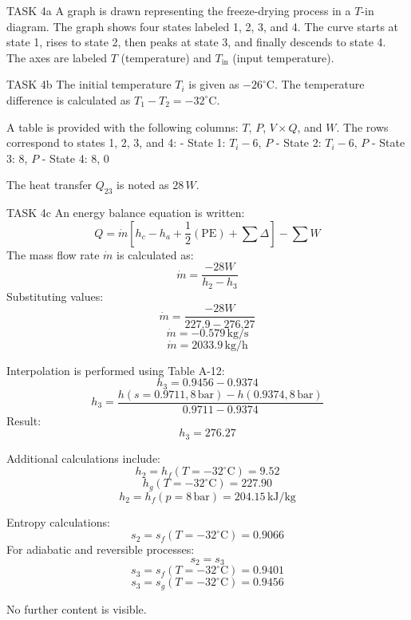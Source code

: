 TASK 4a  
A graph is drawn representing the freeze-drying process in a \( T \)-\( \text{in} \) diagram. The graph shows four states labeled 1, 2, 3, and 4. The curve starts at state 1, rises to state 2, then peaks at state 3, and finally descends to state 4. The axes are labeled \( T \) (temperature) and \( T_{\text{in}} \) (input temperature).  

TASK 4b  
The initial temperature \( T_i \) is given as \( -26^\circ\text{C} \). The temperature difference is calculated as \( T_1 - T_2 = -32^\circ\text{C} \).  

A table is provided with the following columns: \( T \), \( P \), \( V \times Q \), and \( W \). The rows correspond to states 1, 2, 3, and 4:  
- State 1: \( T_i - 6 \), \( P \)  
- State 2: \( T_i - 6 \), \( P \)  
- State 3: \( 8 \), \( P \)  
- State 4: \( 8 \), \( 0 \)  

The heat transfer \( Q_{\text{23}} \) is noted as \( 28 \, W \).  

TASK 4c  
An energy balance equation is written:  
\[
Q = \dot{m} \left[ h_c - h_a + \frac{1}{2} (\text{PE}) + \sum \Delta \right] - \sum W
\]  
The mass flow rate \( \dot{m} \) is calculated as:  
\[
\dot{m} = \frac{-28W}{h_2 - h_3}
\]  
Substituting values:  
\[
\dot{m} = \frac{-28W}{227.9 - 276.27}
\]  
\[
\dot{m} = -0.579 \, \text{kg/s}
\]  
\[
\dot{m} = 2033.9 \, \text{kg/h}
\]  

Interpolation is performed using Table A-12:  
\[
h_3 = 0.9456 - 0.9374
\]  
\[
h_3 = \frac{h(s=0.9711, 8 \, \text{bar}) - h(0.9374, 8 \, \text{bar})}{0.9711 - 0.9374}
\]  
Result:  
\[
h_3 = 276.27
\]  

Additional calculations include:  
\[
h_2 = h_f(T=-32^\circ\text{C}) = 9.52
\]  
\[
h_g(T=-32^\circ\text{C}) = 227.90
\]  
\[
h_2 = h_f(p=8 \, \text{bar}) = 204.15 \, \text{kJ/kg}
\]  

Entropy calculations:  
\[
s_2 = s_f(T=-32^\circ\text{C}) = 0.9066
\]  
For adiabatic and reversible processes:  
\[
s_2 = s_3
\]  
\[
s_3 = s_f(T=-32^\circ\text{C}) = 0.9401
\]  
\[
s_3 = s_g(T=-32^\circ\text{C}) = 0.9456
\]  

No further content is visible.